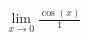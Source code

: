 \documentclass[preview]{standalone}
\begin{document}
\begin{align*}
\lim_{x \to 0} \frac{\cos(x)}{1}
\end{align*}
\end{document}
